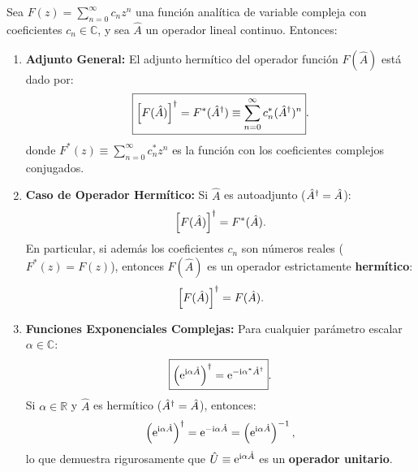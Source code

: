 \begin{teoremabox}
    Sea $F(z) = \sum_{n=0}^\infty c_n z^n$ una función analítica de variable compleja con coeficientes $c_n \in \mathbb{C}$, y sea $\hat{A}$ un operador lineal continuo. Entonces:
    \begin{enumerate}
        \item \textbf{Adjunto General:} El adjunto hermítico del operador función $F(\hat{A})$ está dado por:
        \begin{equation}
            \boxed{\left[ F(\hat{A}) \right]^\dagger = F^*(\hat{A}^\dagger) \equiv \sum_{n=0}^\infty c_n^* (\hat{A}^\dagger)^n}.
            \label{eq:adjunto_funcion_general}
        \end{equation}
        donde $F^*(z) \equiv \sum_{n=0}^\infty c_n^* z^n$ es la función con los coeficientes complejos conjugados.
        \item \textbf{Caso de Operador Hermítico:} Si $\hat{A}$ es autoadjunto ($\hat{A}^\dagger = \hat{A}$):
        \begin{equation}
            \left[ F(\hat{A}) \right]^\dagger = F^*(\hat{A}).
        \end{equation}
        En particular, si además los coeficientes $c_n$ son números reales ($F^*(z) = F(z)$), entonces $F(\hat{A})$ es un operador estrictamente \textbf{hermítico}:
        \begin{equation}
            \left[ F(\hat{A}) \right]^\dagger = F(\hat{A}).
        \end{equation}
        \item \textbf{Funciones Exponenciales Complejas:} Para cualquier parámetro escalar $\alpha \in \mathbb{C}$:
        \begin{equation}
            \boxed{\left( \mathrm{e}^{\mathrm{i}\alpha\hat{A}} \right)^\dagger = \mathrm{e}^{-\mathrm{i}\alpha^*\hat{A}^\dagger}}.
            \label{eq:adjunto_exponencial}
        \end{equation}
        Si $\alpha \in \mathbb{R}$ y $\hat{A}$ es hermítico ($\hat{A}^\dagger = \hat{A}$), entonces:
        \begin{equation}
            \left( \mathrm{e}^{\mathrm{i}\alpha\hat{A}} \right)^\dagger = \mathrm{e}^{-\mathrm{i}\alpha\hat{A}} = \left( \mathrm{e}^{\mathrm{i}\alpha\hat{A}} \right)^{-1},
        \end{equation}
        lo que demuestra rigurosamente que $\hat{U} \equiv \mathrm{e}^{\mathrm{i}\alpha\hat{A}}$ es un \textbf{operador unitario}.
    \end{enumerate}
\end{teoremabox}

